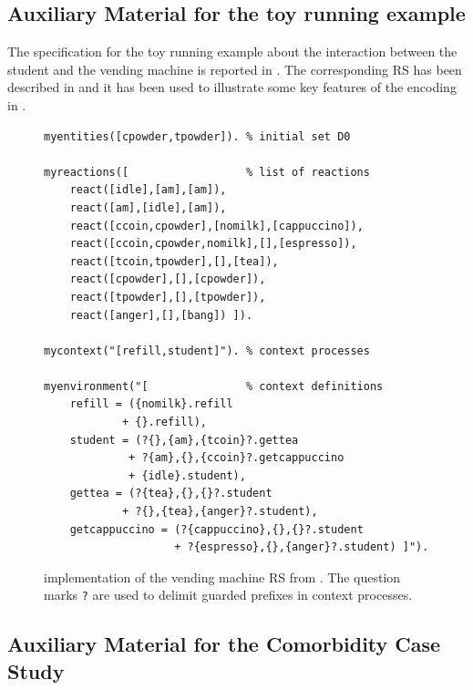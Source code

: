 \subsection{Auxiliary Material for the toy running example}\label{app:running}

The \BioResolve specification for the toy running example about the interaction between the student and the vending machine is reported in . The corresponding RS has been described in  and it has been used to illustrate some key features of the \GROOVE encoding in .

\begin{figure}[t]
\begin{minipage}{0.9\linewidth}
\footnotesize
\begin{verbatim}
myentities([cpowder,tpowder]). % initial set D0

myreactions([                  % list of reactions
    react([idle],[am],[am]),
    react([am],[idle],[am]),
    react([ccoin,cpowder],[nomilk],[cappuccino]),
    react([ccoin,cpowder,nomilk],[],[espresso]),
    react([tcoin,tpowder],[],[tea]),
    react([cpowder],[],[cpowder]),
    react([tpowder],[],[tpowder]),
    react([anger],[],[bang]) ]).

mycontext("[refill,student]"). % context processes

myenvironment("[               % context definitions
    refill = ({nomilk}.refill 
            + {}.refill),
    student = (?{},{am},{tcoin}?.gettea 
             + ?{am},{},{ccoin}?.getcappuccino 
             + {idle}.student),
    gettea = (?{tea},{},{}?.student
            + ?{},{tea},{anger}?.student),
    getcappuccino = (?{cappuccino},{},{}?.student 
                    + ?{espresso},{},{anger}?.student) ]").
\end{verbatim}
\end{minipage}
\caption{\BioResolve implementation of the vending machine RS from . The question marks \texttt{?} are used to delimit guarded prefixes in context processes.}
\label{fig:bioresolve:toy}
\end{figure}

\subsection{Auxiliary Material for the Comorbidity Case Study}

\newcommand{\ent}[1]{\mathsf{#1}}
\newcommand{\ents}[2]{\mathsf{#1}\texttt{\_}\mathsf{#2}}

